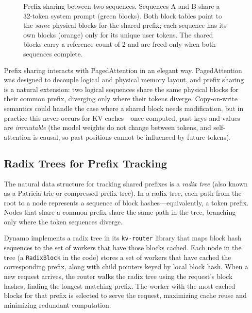 \begin{figure}[ht]
\caption{Prefix sharing between two sequences. Sequences A and B share a 32-token system prompt (green blocks). Both block tables point to the \emph{same} physical blocks for the shared prefix; each sequence has its own blocks (orange) only for its unique user tokens. The shared blocks carry a reference count of 2 and are freed only when both sequences complete.}
\label{fig:prefix-sharing}
\end{figure}

\begin{notebox}
%
Prefix sharing interacts with PagedAttention in an elegant way. PagedAttention was designed to decouple logical and physical memory layout, and prefix sharing is a natural extension: two logical sequences share the same physical blocks for their common prefix, diverging only where their tokens diverge. Copy-on-write semantics could handle the case where a shared block needs modification, but in practice this never occurs for KV caches---once computed, past keys and values are \emph{immutable} (the model weights do not change between tokens, and self-attention is causal, so past positions cannot be influenced by future tokens).
\end{notebox}

\subsection{Radix Trees for Prefix Tracking}

The natural data structure for tracking shared prefixes is a \emph{radix tree} (also known as a Patricia trie or compressed prefix tree). In a radix tree, each path from the root to a node represents a sequence of block hashes---equivalently, a token prefix. Nodes that share a common prefix share the same path in the tree, branching only where the token sequences diverge.

%
Dynamo implements a radix tree in its \texttt{kv-router} library that maps block hash sequences to the set of workers that have those blocks cached. Each node in the tree (a \texttt{RadixBlock} in the code) stores a set of workers that have cached the corresponding prefix, along with child pointers keyed by local block hash. When a new request arrives, the router walks the radix tree using the request's block hashes, finding the longest matching prefix. The worker with the most cached blocks for that prefix is selected to serve the request, maximizing cache reuse and minimizing redundant computation.

